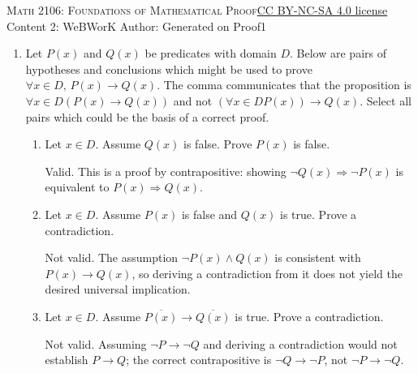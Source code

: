\newpage\handout
{\textsc{Math 2106: Foundations of Mathematical Proof}}{\href{https://creativecommons.org/licenses/by-nc-sa/4.0/}{CC BY-NC-SA 4.0 license}}
{Content 2: WeBWorK}
{Author: \href{\HandoutAuthorUrl}{\HandoutAuthor}}{Generated on \generatedOn}
{Proof1}

\newpage






% 





\begin{enumerate}
  \item Let $P(x)$ and $Q(x)$ be predicates with domain $D$. Below are pairs of hypotheses and conclusions which might be used to prove $\forall x \in D,\, P(x) \rightarrow Q(x)$.  
  The comma communicates that the proposition is $\forall x \in D(P(x) \rightarrow Q(x))$ and not $(\forall x \in D P(x)) \rightarrow Q(x)$.  
  Select all pairs which could be the basis of a correct proof.

  \begin{enumerate}[label=\Alph*.]
    \item Let $x \in D$. Assume $Q(x)$ is false. Prove $P(x)$ is false.\\
    \begin{subanswer}
        Valid. This is a proof by contrapositive: showing $\lnot Q(x)\Rightarrow \lnot P(x)$ is equivalent to $P(x)\Rightarrow Q(x)$.
    \end{subanswer}

    \item Let $x \in D$. Assume $P(x)$ is false and $Q(x)$ is true. Prove a contradiction.\\
    \begin{subanswer}
        Not valid. The assumption $\lnot P(x)\land Q(x)$ is consistent with $P(x)\rightarrow Q(x)$, so deriving a contradiction from it does not yield the desired universal implication.
    \end{subanswer}

    \item Let $x \in D$. Assume $\overline{P(x)} \rightarrow \overline{Q(x)}$ is true. Prove a contradiction.\\
    \begin{subanswer}
        Not valid. Assuming $\lnot P\rightarrow\lnot Q$ and deriving a contradiction would not establish $P\rightarrow Q$; the correct contrapositive is $\lnot Q\rightarrow\lnot P$, not $\lnot P\rightarrow\lnot Q$.
    \end{subanswer}


\end{enumerate}
\end{enumerate}
